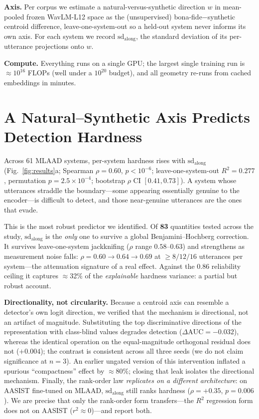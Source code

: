 \documentclass{article}
\begin{document}
\textbf{Axis.} Per corpus we estimate a natural-versus-synthetic direction $w$ in
mean-pooled frozen WavLM-L12 space as the (unsupervised) bona-fide$-$synthetic
centroid difference, leave-one-system-out so a held-out system never informs its
own axis. For each system we record $\mathrm{sd}_{\mathrm{along}}$, the standard
deviation of its per-utterance projections onto $w$.

\textbf{Compute.} Everything runs on a single GPU; the largest single training run
is $\approx 10^{16}$ FLOPs (well under a $10^{20}$ budget), and all geometry re-runs
from cached embeddings in minutes.

\section{A Natural--Synthetic Axis Predicts Detection Hardness}
\label{sec:law}
Across 61 MLAAD systems, per-system hardness rises with
$\mathrm{sd}_{\mathrm{along}}$ (Fig.~\ref{fig:results}a; Spearman $\rho=0.60$,
$p<10^{-6}$; leave-one-system-out $R^2=0.277$, permutation $p=2.5\times10^{-4}$;
bootstrap $\rho$ CI $[0.41,0.73]$). A system whose utterances straddle the
boundary---some appearing essentially genuine to the encoder---is difficult to
detect, and those near-genuine utterances are the ones that evade.

This is the most robust predictor we identified. Of \textbf{83} quantities tested
across the study, $\mathrm{sd}_{\mathrm{along}}$ is the \emph{only} one to survive
a global Benjamini--Hochberg correction. It survives leave-one-system jackknifing
($\rho$ range $0.58$--$0.63$) and strengthens as measurement
noise falls: $\rho=0.60\!\to\!0.64\!\to\!0.69$ at $\geq 8/12/16$ utterances per
system---the attenuation signature of a real effect. Against the $0.86$
reliability ceiling it captures $\approx$32\% of the \emph{explainable} hardness
variance: a partial but robust account.

\textbf{Directionality, not circularity.} Because a centroid axis can resemble a
detector's own logit direction, we verified that the mechanism is directional,
not an artifact of magnitude. Substituting the top discriminative directions of the
representation with class-blind values degrades detection
($\Delta\mathrm{AUC}=-0.032$), whereas the identical operation on the
equal-magnitude orthogonal residual does not ($+0.004$); the contrast is
consistent across all three seeds (we do not claim significance at $n=3$). An earlier ungated version of this intervention inflated a spurious ``compactness''
effect by $\approx$80\%; closing that leak isolates the directional mechanism. Finally, the rank-order law
\emph{replicates on a different architecture}: on AASIST fine-tuned on MLAAD,
$\mathrm{sd}_{\mathrm{along}}$ still ranks hardness ($\rho=+0.35$, $p=0.006$). We
are precise that only the rank-order form transfers---the $R^2$ regression form
does not on AASIST ($r^2\approx0$)---and report both.
\end{document}
